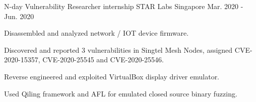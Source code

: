 

\begin{cventries}

  \cventry
    {N-day Vulnerability Researcher internship} %
    {STAR Labs} %
    {Singapore} %
    {Mar. 2020 - Jun. 2020} %
    {
      \begin{cvitems} %
        \item {Disassembled and analyzed network / IOT device firmware.}
        \item {Discovered and reported 3 vulnerabilities in Singtel Mesh Nodes, assigned CVE-2020-15357, CVE-2020-25545 and CVE-2020-25546.}
        \item {Reverse engineered and exploited VirtualBox display driver emulator.}
        \item {Used Qiling framework and AFL for emulated closed source binary fuzzing.}
      \end{cvitems}
    }


\end{cventries}
